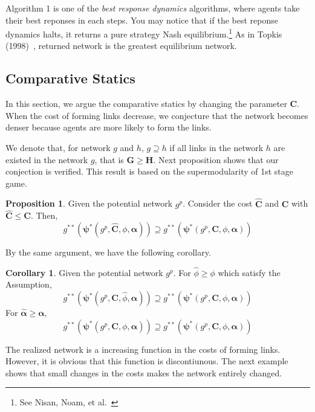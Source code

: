 \documentclass[12pt]{article}
\theoremstyle{definition}
\newtheorem{proposition}{Proposition}
\newtheorem{corollary}{Corollary}
\begin{document}
Algorithm 1 is one of the {\it{best response dynamics}} algorithms, where agents take their best reponses in each steps.
You may notice that if the best reponse dynamics halts, it returns a pure strategy Nash equilibrium.\footnote{See Nisan, Noam, et al.~\cite{AGT}}
As in Topkis (1998)~\cite{topkis1998}, returned network is the greatest equilibrium network.


\subsection{Comparative Statics}

In this section, we argue the comparative statics by changing the parameter $\bm{C}$.
When the cost of forming links decrease, we conjecture that the network becomes denser because agents are more likely to form the links.

We denote that, for network $g$ and $h$, $g \supseteq h$ if all links in the network $h$ are existed in the network $g$, that is $\bm{G} \ge \bm{H}$.
Next proposition shows that our conjection is verified.
This result is based on the supermodularity of 1st stage game.

\begin{proposition}
Given the potential network $g^p$.
Consider the cost $\bm{\hat{C}}$ and $\bm{C}$ with $\bm{\hat{C}} \le \bm{C}$.
Then,
\[ g^{**}(\bm{\psi}^*(g^p, \bm{\hat{C}}, \phi, \bm{\alpha})) \supseteq g^{**}(\bm{\psi}^*(g^p, \bm{C}, \phi, \bm{\alpha})) \]
\end{proposition}

By the same argument, we have the following corollary.

\begin{corollary}
	Given the potential network $g^p$. For $\hat{\phi} \ge \phi$ which satisfy the Assumption,
        \[ g^{**}(\bm{\psi}^*(g^p, \bm{C}, \hat{\phi}, \bm{\alpha})) \supseteq g^{**}(\bm{\psi}^*(g^p, \bm{C}, \phi, \bm{\alpha})) \]
    For $\bm{\hat{\alpha}} \ge \bm{\alpha}$,
        \[ g^{**}(\bm{\psi}^*(g^p, \bm{C}, \phi, \bm{\hat{\alpha}})) \supseteq g^{**}(\bm{\psi}^*(g^p, \bm{C}, \phi, \bm{\alpha})) \]
\end{corollary}

The realized network is a increasing function in the costs of forming links.
However, it is obvious that this function is discontiunous.
The next example shows that small changes in the costs makes the network entirely changed.
\end{document}
